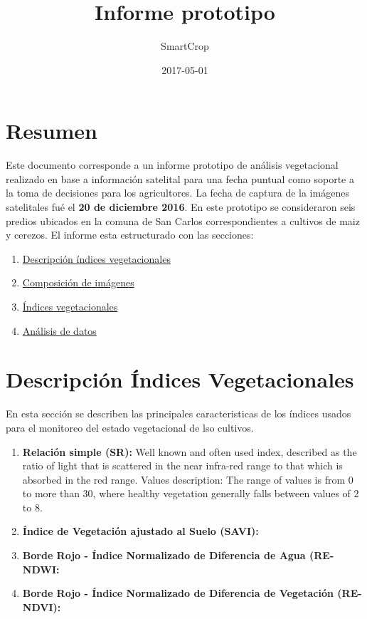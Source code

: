 \documentclass[]{report}
\title{Informe prototipo}
\author{SmartCrop}
\date{2017-05-01}
\providecommand{\tightlist}{%
  \setlength{\itemsep}{0pt}\setlength{\parskip}{0pt}}
\begin{document}
\maketitle

{
\setcounter{tocdepth}{1}
\tableofcontents
}
\chapter{Resumen}\label{resumen}

Este documento corresponde a un informe prototipo de análisis
vegetacional realizado en base a información satelital para una fecha
puntual como soporte a la toma de decisiones para los agricultores. La
fecha de captura de la imágenes satelitales fué el \textbf{20 de
diciembre 2016}. En este prototipo se consideraron seis predios ubicados
en la comuna de San Carlos correspondientes a cultivos de maiz y
cerezos. El informe esta estructurado con las secciones:

\begin{enumerate}
\def\labelenumi{\arabic{enumi}.}
\tightlist
\item
  \protect\hyperlink{DescripcionVIs}{Descripción índices vegetacionales}
\item
  \protect\hyperlink{DescipcionVIs}{Composición de imágenes}
\item
  \protect\hyperlink{indicesVeg}{Índices vegetacionales}
\item
  \protect\hyperlink{AnalisisDatos}{Análisis de datos}
\end{enumerate}

\hypertarget{DescripcionVIs}{\chapter{Descripción Índices
Vegetacionales}\label{DescripcionVIs}}

En esta sección se describen las principales caracteristicas de los
índices usados para el monitoreo del estado vegetacional de lso
cultivos.

\begin{enumerate}
\def\labelenumi{\arabic{enumi}.}
\item
  \textbf{Relación simple (SR):} Well known and often used index,
  described as the ratio of light that is scattered in the near
  infra-red range to that which is absorbed in the red range. Values
  description: The range of values is from 0 to more than 30, where
  healthy vegetation generally falls between values of 2 to 8.
\item
  \textbf{Índice de Vegetación ajustado al Suelo (SAVI):}
\item
  \textbf{Borde Rojo - Índice Normalizado de Diferencia de Agua
  (RE-NDWI:}
\item
  \textbf{Borde Rojo - Índice Normalizado de Diferencia de Vegetación
  (RE-NDVI):}
\end{enumerate}
\end{document}
